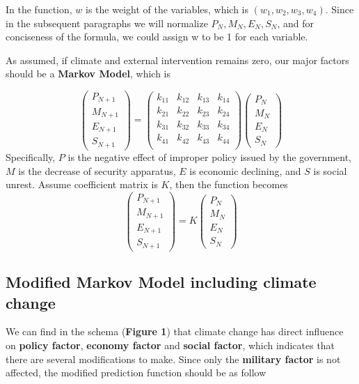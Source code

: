 \documentclass{mcmthesis}
\begin{document}
	In the function, $w$ is the weight of the variables, which is $(w_1, w_2, w_3, w_4)$. Since in the subsequent paragraphs we will normalize $P_N, M_N, E_N, S_N$, and for conciseness of the formula, we could assign w to be 1 for each variable.
	
	As assumed, if climate and external intervention remains zero, our major factors should be a \textbf{Markov Model}, which is
	
	$$
	\left(
	\begin{matrix}
	P_{N+1} \\ M_{N+1} \\ E_{N+1} \\ S_{N+1}
	\end{matrix}
	\right) 
	= 
	\left(
	\begin{matrix}
	k_{11} & k_{12} & k_{13} & k_{14} \\
	k_{21} & k_{22} & k_{23} & k_{24} \\
	k_{31} & k_{32} & k_{33} & k_{34} \\
	k_{41} & k_{42} & k_{43} & k_{44} \\
	\end{matrix}
	\right) 
	\left(
	\begin{matrix}
	P_N \\ M_N \\ E_N \\ S_N
	\end{matrix}
	\right) 
	$$
	Specifically, $P$ is the negative effect of improper policy issued by the government, $M$ is the decrease of security apparatus, $E$ is economic declining, and $S$ is social unrest. Assume coefficient matrix is $K$, then the function becomes
	$$
	\left(
	\begin{matrix}
	P_{N+1} \\ M_{N+1} \\ E_{N+1} \\ S_{N+1}
	\end{matrix}
	\right) 
	= 
	K
	\left(
	\begin{matrix}
	P_N \\ M_N \\ E_N \\ S_N
	\end{matrix}
	\right) 
	$$
	
	\subsection{Modified Markov Model including climate change}
	
	We can find in the schema (\textbf{Figure 1}) that climate change has direct influence on \textbf{policy factor}, \textbf{economy factor} and \textbf{social factor}, which indicates that there are several modifications to make. Since only the \textbf{military factor} is not affected, the modified prediction function should be as follow
	
\end{document}
